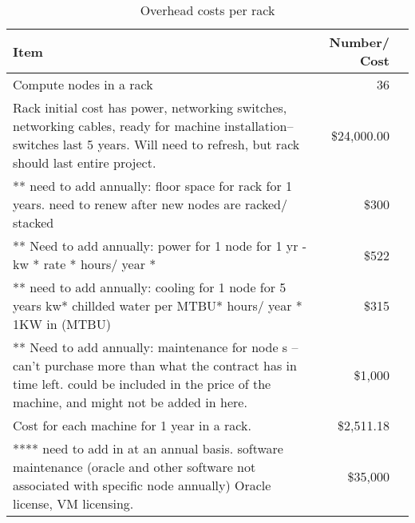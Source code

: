 \tiny \begin{longtable} { |p{}  |r  |r |} 
\caption{Overhead costs per rack \label{tab:overheads}}\\ 
\hline 
\textbf{Item}&\textbf{Number/ Cost} \\ \hline
{Compute nodes in a rack }&{36} \\ \hline
{Rack initial cost has power, networking switches, networking cables, ready for machine installation-- switches last 5 years.  Will need to refresh, but rack should last entire project.  }&{\$24,000.00} \\ \hline
{ ** need to add annually: floor space for rack for 1 years.   need to renew after new nodes are racked/ stacked }&{\$300} \\ \hline
{** Need to add annually: power for 1 node for 1 yr - kw * rate * hours/ year * }&{\$522} \\ \hline
{** need to add annually: cooling for 1 node for 5 years  kw* chillded water per MTBU* hours/ year *  1KW in (MTBU) }&{\$315} \\ \hline
{** Need to add annually: maintenance for node s -- can't purchase more than what the contract has in time left.  could be included in the price of the machine, and might not be added in here.  }&{\$1,000} \\ \hline
{Cost for each machine for 1 year in a rack.   }&{\$2,511.18} \\ \hline
{**** need to add in at an annual basis.  software maintenance (oracle and other software not associated with specific node annually)  Oracle license, VM licensing.  }&{\$35,000} \\ \hline
\end{longtable} \normalsize
